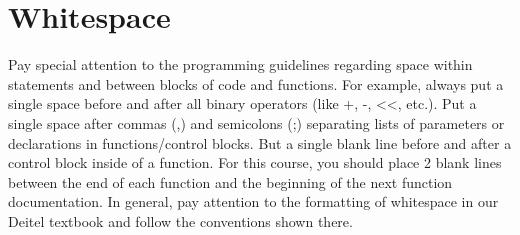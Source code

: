 \documentclass[11pt]{article}
\begin{document}
\section*{Whitespace}
\label{sec-7}


Pay special attention to the programming guidelines regarding space
within statements and between blocks of code and functions.  For
example, always put a single space before and after all binary
operators (like +, -, <<, etc.).  Put a single space after commas (,)
and semicolons (;) separating lists of parameters or declarations in
functions/control blocks.  But a single blank line before and after a
control block inside of a function.  For this course, you should place
2 blank lines between the end of each function and the beginning of
the next function documentation.  In general, pay attention to the
formatting of whitespace in our Deitel textbook and follow the
conventions shown there.
\end{document}
